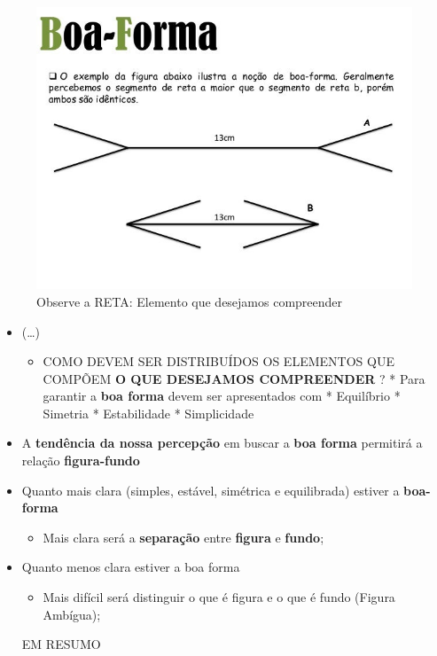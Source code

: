 \documentclass[
]{book}
\providecommand{\tightlist}{%
  \setlength{\itemsep}{0pt}\setlength{\parskip}{0pt}}
\begin{document}
\begin{figure}

{\centering \includegraphics[width=0.7\linewidth]{figuras/gestalt-exemplo-boa-forma} 

}

\caption{Observe a RETA: Elemento que desejamos compreender}\label{fig:unnamed-chunk-7}
\end{figure}

\begin{itemize}
\item
  (\ldots)

  \begin{itemize}
  \tightlist
  \item
    COMO DEVEM SER DISTRIBUÍDOS OS ELEMENTOS QUE COMPÕEM \textbf{O QUE
    DESEJAMOS COMPREENDER} ? * Para garantir a \textbf{boa forma} devem
    ser apresentados com * Equilíbrio * Simetria * Estabilidade
    * Simplicidade
  \end{itemize}
\item
  A \textbf{tendência da nossa percepção} em buscar a \textbf{boa forma}
  permitirá a relação \textbf{figura-fundo}
\item
  Quanto mais clara (simples, estável, simétrica e equilibrada)
  estiver a \textbf{boa-forma}

  \begin{itemize}
  \tightlist
  \item
    Mais clara será a \textbf{separação} entre \textbf{figura} e \textbf{fundo};
  \end{itemize}
\item
  Quanto menos clara estiver a boa forma

  \begin{itemize}
  \tightlist
  \item
    Mais difícil será distinguir o que é figura e o que é fundo
    (Figura Ambígua);
  \end{itemize}

  EM RESUMO
\end{itemize}
\end{document}

